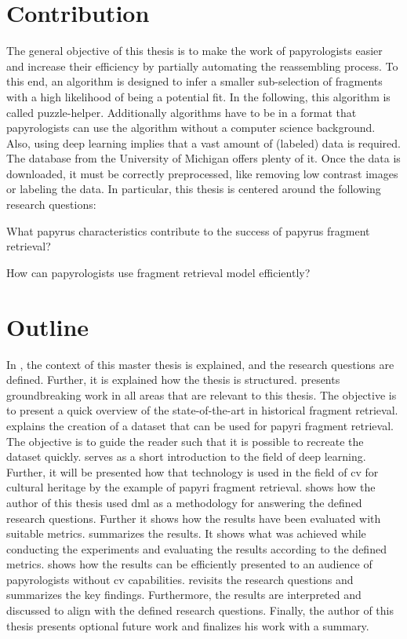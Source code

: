 \section{Contribution}
The general objective of this thesis is to make the work of papyrologists easier and increase their efficiency
by partially automating the reassembling process. To this end, an algorithm is designed to infer a
smaller sub-selection of fragments with a high likelihood of being a potential fit. In the following, this
algorithm is called puzzle-helper. Additionally algorithms have to be in a format that papyrologists can use the algorithm without a computer science background. Also, using deep learning implies that a vast amount of (labeled) data is required. The database from the University of Michigan offers plenty of it. Once the data is downloaded, it must be correctly preprocessed, like removing low contrast images or labeling the data. In particular, this thesis is centered around the following research questions:
\begin{questions}
	\item What papyrus characteristics contribute to the success of papyrus fragment retrieval?
	\item How can papyrologists use fragment retrieval model efficiently?
\end{questions}

\section{Outline}
In , the context of this master thesis is explained, and the research questions are defined. Further, it is explained how the thesis is structured.  presents groundbreaking work in all areas that are relevant to this thesis. The objective is to present a quick overview of the state-of-the-art in historical fragment retrieval.  explains the creation of a dataset that can be used for papyri fragment retrieval. The objective is to guide the reader such that it is possible to recreate the dataset quickly.  serves as a short introduction to the field of deep learning. Further, it will be presented how that technology is used in the field of \ac{cv} for cultural heritage by the example of papyri fragment retrieval.  shows how the author of this thesis used \ac{dml} as a methodology for answering the defined research questions. Further it shows how the results have been evaluated with suitable metrics.  summarizes the results. It shows what was achieved while conducting the experiments and evaluating the results according to the defined metrics.  shows how the results can be efficiently presented to an audience of papyrologists without \ac{cv} capabilities.  revisits the research questions and summarizes the key findings. Furthermore, the results are interpreted and discussed to align with the defined research questions. Finally, the author of this thesis presents optional future work and finalizes his work with a summary. 